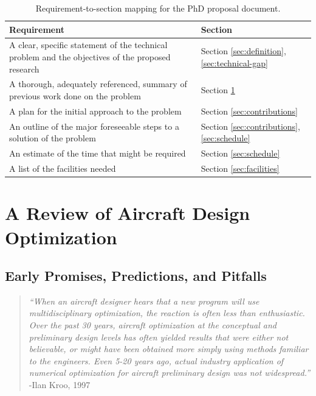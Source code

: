 \documentclass[12pt,vi,oneside]{report}
\begin{document}
    \begingroup
    \renewcommand{\arraystretch}{1.5} %
    \begin{table}[H]
        \centering
        \caption{Requirement-to-section mapping for the PhD proposal document.}
        \label{tab:toc}
        \begin{tabular}{p{10cm}|p{4cm}}
            Requirement                                                                                      & Section                                               \\
            \hline
            A clear, specific statement of the technical problem and the objectives of the proposed research & Section \ref{sec:definition}, \ref{sec:technical-gap} \\
            A thorough, adequately referenced, summary of previous work done on the problem                  & Section \ref{sec:literature}                          \\
            A plan for the initial approach to the problem                                                   & Section \ref{sec:contributions}                       \\
            An outline of the major foreseeable steps to a solution of the problem                           & Section \ref{sec:contributions}, \ref{sec:schedule}   \\
            An estimate of the time that might be required                                                   & Section \ref{sec:schedule}                            \\
            A list of the facilities needed                                                                  & Section \ref{sec:facilities}                          \\
        \end{tabular}
    \end{table}
    \endgroup


    \chapter{A Review of Aircraft Design Optimization}
    \label{sec:literature}


    \section{Early Promises, Predictions, and Pitfalls}

    \begin{quote}
        \textit{``When an aircraft designer hears that a new program will use multidisciplinary optimization, the reaction is often less than enthusiastic. Over the past 30 years, aircraft optimization at the conceptual and preliminary design levels has often yielded results that were either not believable, or might have been obtained more simply using methods familiar to the engineers. Even 5-20 years ago, actual industry application of numerical optimization for aircraft preliminary design was not widespread.''}
        \flushright-Ilan Kroo, 1997 \cite{kroo_multidisciplinary_1997}
    \end{quote}
\end{document}
